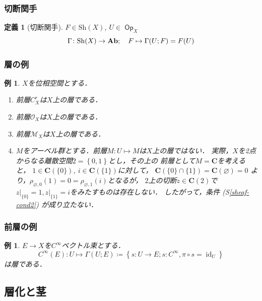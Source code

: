 \documentclass[dvipdfmx,12pt,aspectratio=169,leqno]{beamer}%
\newcommand{\cc}{\mathbf{C}}
\newcommand{\Ab}{{\bf Ab}}
\numberwithin{equation}{subsection}
\newcommand{\Op}{\mathop{\textsf{Op}}\nolimits}
\newcommand{\id}{\mathop{\mathrm{id}}\nolimits}
\newcommand{\Sh}{\mathrm{Sh}}
\theoremstyle{mystyle}
\newtheorem{DFN}[AXM]{定義}
\newtheorem{EG}[AXM]{例}
\begin{document}
\begin{frame}
    \frametitle{切断関手}

    \begin{DFN}[切断関手]
        \(F\in\Sh(X)\), \(U\in\Op_{X}\)
        \[
            \Gamma\colon \Sh(X)\to \Ab;\quad F\mapsto
            \Gamma(U;F)=F(U)
        \]
    \end{DFN}    
\end{frame}



\begin{frame}
    \frametitle{層の例}
    \begin{EG}\label{eg:sheaf}
        \(X\)を位相空間とする．
        \begin{enumerate}
            \item 前層\(C_X^r\)は\(X\)上の層である．
            \item 前層\(\mathscr{O}_X\)は\(X\)上の層である．
            \item 前層\(\mathscr{M}_X\)は\(X\)上の層である．
            \item \(M\)をアーベル群とする．前層\(M\colon U\mapsto M\)は\(X\)上の層ではない．
            実際，\(X\)を2点からなる離散空間\(2=\left\{0,1\right\}\)とし，その上の
            前層として\(M=\cc\)を考えると，
            \(1\in\cc(\{0\})\), \(i\in\cc(\{1\})\)に対して，
            \(\cc(\{0\}\cap\{1\})=\cc(\varnothing)=0\)
            より，\(\rho_{\varnothing,{0}}(1)=0
            =\rho_{\varnothing,{1}}(i)\)となるが，
            \(2\)上の切断\(z\in\cc(2)\)で\(z\rvert_{\{0\}}=1,
            z\rvert_{\{1\}}=i\)をみたすものは存在しない．
            したがって，条件 (S\ref{sheaf-cond2}) が成り立たない．\label{eg:non-sheaf}
        \end{enumerate}
    \end{EG}    
\end{frame}

\begin{frame}
    \frametitle{前層の例}
    \begin{EG}
        \(E\to X\)を\(C^{\infty}\)ベクトル束とする．
        \[
            C^{\infty}(E)\colon U\mapsto \Gamma(U;E)\coloneqq
            \left\{s\colon U\to E;s\colon C^{\infty}, \pi\circ s=\id_U\right\}
        \]は層である．
    \end{EG}
\end{frame}


\subsection{層化と茎}
\end{document}
